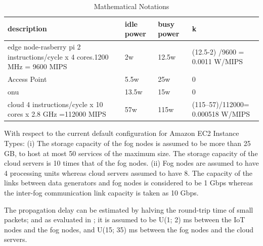 \documentclass[twocolumn]{article}
\begin{document}
\begin{table}[!htbp]
\setlength\tabcolsep{0pt}
\scriptsize\centering
\caption {Mathematical Notations}\label{tab:5}
\smallskip
\begin{tabular*}{8.0cm}{|p{3.5cm}p{1.2cm}p{1.3cm}p{2cm}|}
\hline
description&idle power&busy power&k\\
\hline
    edge node-rasberry pi 2 instructions/cycle x 4 cores.1200 MHz = 9600 MIPS&2w&12.5w&(12.5-2) /9600 = 0.0011 W/MIPS\\
    Access Point&5.5w&25w&0\\
	onu&13.5w&15w&0\\
	cloud 4 instructions/cycle x 10 cores x 2.8 GHz =112000 MIPS&57w&115w&(115--57)/112000= 0.000518 W/MIPS\\
\hline
\end{tabular*}
\end{table}

\par With respect to the current default configuration for Amazon EC2 Instance Types:
(i) The storage capacity of the fog nodes is assumed to be more than 25 GB, to host at most 50 services of the maximum size. The storage capacity of the cloud servers is 10 times that of the fog nodes. (ii) Fog nodes are assumed to have 4 processing units whereas cloud servers assumed to have 8. The capacity of the links between data generators and fog nodes is considered to be 1 Gbps whereas the inter-fog communication link capacity is taken as 10 Gbps\cite{hussain2019fog,yousefpour2019fogplan}.

\par The propagation delay can be estimated by halving the round-trip time of small packets; and as evaluated in \cite{yousefpour2018reducing}; it is assumed to be U(1; 2) ms between the IoT nodes and the fog nodes, and U(15; 35) ms between the fog nodes and the cloud servers. 
\end{document}
